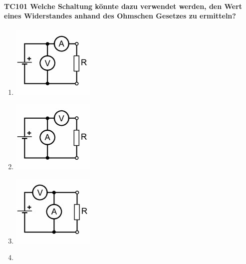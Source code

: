 \documentclass[8pt]{article}
\begin{document}
\begin{enumerate}
\begin{enumerate}[nolistsep,label=\Alph*]
\paragraph*{TC101 Welche Schaltung könnte dazu verwendet werden, den Wert eines Widerstandes anhand des Ohmschen Gesetzes zu ermitteln?}
\begin{enumerate}[nolistsep,label=\Alph*]
\item 
	\begin{center}
		\begin{minipage}{\linewidth}
			\centering
			\includegraphics[scale=1.0]{pics/tc101_a.jpg}
		\end{minipage}
	\end{center}
\item
	\begin{center}
		\begin{minipage}{\linewidth}
			\centering
			\includegraphics[scale=1.0]{pics/tc101_b.jpg}
		\end{minipage}
	\end{center}
\item 
	\begin{center}
		\begin{minipage}{\linewidth}
			\centering
			\includegraphics[scale=1.0]{pics/tc101_c.jpg}
		\end{minipage}
	\end{center}
\item
	\begin{center}

\end{center}
\end{enumerate}
\end{enumerate}
\end{enumerate}
\end{document}
